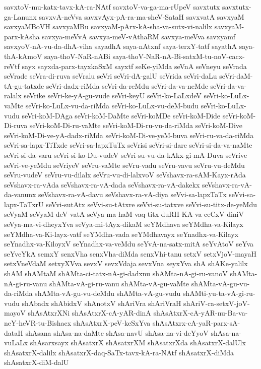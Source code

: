 {savxtoV-mu-katx-tavx-kA-ra-NAtf
savxtoV-va-ga-ma-rUpeV
savxtutx
savxtutx-ga-Lanunx
savxvA-neVva
savxvAyx-pA-ra-ma-sheV-SataH
savxvatA
savxyaM
savxyaMBoVH
savxyaMBu
savxyaM-pArx-kA-sha-va-sutx-vi-nalilx
savxyaM-parx-kAsha
savxya-meVvA
savxya-meV-vAthaRM
savxya-meVva
savxyamf
savxyoV-nA-vu-da-dhA-viha
sayadhA
saya-nAtxnf
saya-terxY-tatf
sayathA
saya-thA-kAmoV
saya-thoV-NaR-nABi
saya-thoV-NaR-nA-Bi-satxM-tu-noV-cacx-reVtf
sayx
sayxda-parx-tayxkaSxM
sayxtf
seKe-yiMda
seVnA
seVneyu
seVrada
seVrade
seVra-di-ruva
seVralu
seVri
seVri-dA-galU
seVrida
seVri-daLu
seVri-daM-tA-gu-tatxde
seVri-dadx-riMda
seVri-da-reMdu
seVri-da-va-neMde
seVri-da-va-ralalx
seVrike
seVri-ke-yA-gu-vude
seVri-keyU
seVri-ko-LaLxdeV
seVri-ko-LuLx-vaMte
seVri-ko-LuLx-vu-da-riMda
seVri-ko-LuLx-vu-deM-budu
seVri-ko-LuLx-vudu
seVri-koM-DAga
seVri-koM-DaMte
seVri-koMDe
seVri-koM-Dide
seVri-koM-Di-ruva
seVri-koM-Di-ru-vaMte
seVri-koM-Di-ru-vu-da-riMda
seVri-koM-Dive
seVri-koM-Di-ve-yA-dadx-riMda
seVri-koM-Di-ve-yeM-buva
seVri-ru-va-da-riMda
seVri-sa-lapx-TiTxde
seVri-sa-lapxTuTx
seVrisi
seVri-si-dare
seVri-si-da-va-naMte
seVri-si-da-varu
seVri-si-ko-Du-vudeV
seVri-su-vu-da-kAkx-gi-mA-Duva
seVrive
seVri-ve-yeMdu
seVriyeV
seVru-vaMte
seVru-vadu
seVru-vavu
seVru-vu-deMdu
seVru-vudeV
seVru-vu-dilalx
seVru-vu-di-lalxvoV
seVshavx-ra-sAM-Kayx-rAda
seVshavx-ra-vAda
seVshavx-ra-vA-dada
seVshavx-ra-vA-dakekx
seVshavx-ra-vA-da-vanunx
seVshavx-ra-vA-davu
seVshavx-ra-vA-diya
seVvi-sa-lapxTaTx
seVvi-sa-lapx-TaTxrU
seVvi-sutAtx
seVvi-su-tAtxre
seVvi-su-tatxve
seVvi-su-titx-de-yeMdu
seVyaM
seVyaM-deV-vatA
seVya-ma-haM-vaq-titx-duRH-KA-va-ceCxV-diniV
seVya-ma-vi-dheyxYva
seVya-mi-tAyx-dikaM
seYMdhava
seYMdha-va-Kilayx
seYMdha-va-Ki-layx-vatf
seYMdha-vada
seYMdhavayx
seYnadhx-va-Kilayx
seYnadhx-va-KiloyxV
seYnadhx-va-veMdu
seYvA-na-satx-mitA
seYvAtoV
seYva
seYveYkA
semxY
senxVha
senxVha-diMda
senxVhi-tanu
setxV
setxVjoV-mayaH
setxVneVdaM
setxyXVva
sevxV
sevxVdaja
sevxVna
seyxYva
shA
shAKe-yalilx
shAM
shAMtaM
shAMta-ci-tatx-nA-gi-dadxnu
shAMta-nA-gi-ru-vanoV
shAMta-nA-gi-ru-vanu
shAMta-vA-gi-ru-vanu
shAMta-vA-gu-vaMte
shAMta-vA-gu-vu-da-riMda
shAMta-vA-gu-vu-deMdu
shAMta-vA-gu-vudu
shAMti-yu-ta-vA-gi-ru-vudu
shAbadx
shAbidxV
shAnotxV
shAriVra
shAriVraH
shAriV-ra-setxV-joV-mayoV
shAsAtxrXNi
shAsAtxrX-cA-yAR-dinA
shAsAtxrX-cA-yAR-nu-Ba-va-neY-heVR-tu-Bishacx
shAsAtxrX-peV-keSxYva
shAsAtxrx-cA-yaR-parx-sA-dataH
shAsana
shAsa-na-daMte
shAsa-navU
shAsa-na-vi-deYyoV
shAsa-na-vuLaLx
shAsarxsayx
shAsatxrX
shAsatxrXM
shAsatxrXda
shAsatxrX-dalUlx
shAsatxrX-dalilx
shAsatxrX-daq-SaTx-tavx-kA-ra-NAtf
shAsatxrX-diMda
shAsatxrX-diM-dalU
}

